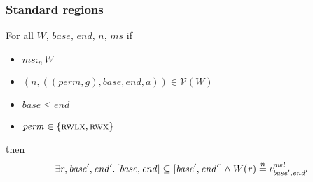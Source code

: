 \documentclass[a4paper]{article}
\newcommand{\nequal}[1][n]{\stackrel{\tiny{#1}}{=}}
\newcommand{\var}[1]{\mathit{#1}}
\newcommand{\hs}{\var{ms}}
\newcommand{\ms}{\hs}
\newcommand{\gl}{\var{g}}
\newcommand{\addr}{\var{a}}
\newcommand{\start}{\var{base}}
\newcommand{\addrend}{\var{end}}
\newcommand{\heap}{\var{mem}}
\newcommand{\perm}{\var{perm}}
\newcommand{\stdcap}[1][(\perm,\gl)]{\left(#1,\start,\addrend,\addr \right)}
\newcommand{\pwl}{\var{pwl}}
\newcommand{\heapSat}[3][\heap]{#1 :_{#2} #3}
\newcommand{\memSat}[3][n]{\heapSat[#2]{#1}{#3}}
\newcommand{\asmType}{\plaindom{AsmType}}
\newcommand{\plaindom}[1]{\mathrm{#1}}
\newcommand{\intr}[2]{\mathcal{#1}}
\newcommand{\valueintr}[1]{\intr{V}{#1}}
\newcommand{\stdvr}{\valueintr{\asmType}}
\newcommand{\npair}[2][n]{\left(#1,#2 \right)}
\newcommand{\plainperm}[1]{\textsc{#1}}
\newcommand{\rwx}{\plainperm{rwx}}
\newcommand{\rwlx}{\plainperm{rwlx}}
\begin{document}
\subsubsection{Standard regions}

\begin{lemma}
  \label{lem:pwl-stack}
  For all $W$, $\start$, $\addrend$, $n$, $\ms$ if
  \begin{itemize}
  \item $\memSat{\ms}{W}$
  \item $\npair{\stdcap} \in \stdvr(W)$
  \item $\start \leq \addrend$
  \item $\perm \in \{ \rwlx, \rwx \}$
  \end{itemize}
  then
  \[
    \exists r, \start',\addrend' \ldotp [\start,\addrend] \subseteq [\start',\addrend'] \land W(\var{r}) \nequal \iota^\pwl_{\start',\addrend'}
  \]
\end{lemma}
\end{document}
